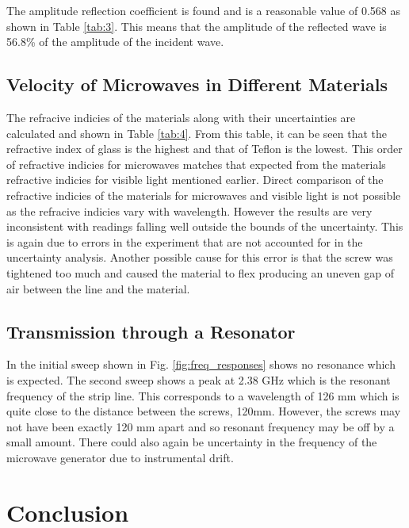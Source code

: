 \documentclass[12pt]{article}
\begin{document}
The amplitude reflection coefficient is found and is a reasonable value of 0.568 as shown in Table \ref{tab:3}.
This means that the amplitude of the reflected wave is 56.8\% of the amplitude of the incident wave.

\subsection{Velocity of Microwaves in Different Materials}
The refracive indicies of the materials along with their uncertainties are calculated and shown in Table \ref{tab:4}.
From this table, it can be seen that the refractive index of glass is the highest and that of Teflon is the lowest.
This order of refractive indicies for microwaves matches that expected from the materials refractive indicies for visible light mentioned earlier.
Direct comparison of the refractive indicies of the materials for microwaves and visible light is not possible as the refracive indicies vary with wavelength.
However the results are very inconsistent with readings falling well outside the bounds of the uncertainty. This is again
due to errors in the experiment that are not accounted for in the uncertainty analysis.
Another possible cause for this error is that the screw was tightened too much and caused the material to flex producing an 
uneven gap of air between the line and the material.

\subsection{Transmission through a Resonator}
In the initial sweep shown in Fig. \ref{fig:freq_responses} shows no resonance which is expected.
The second sweep shows a peak at 2.38 GHz which is the resonant frequency of the strip line.
This corresponds to a wavelength of 126 mm which is quite close to the distance between the screws, 120mm.
However, the screws may not have been exactly 120 mm apart and so resonant frequency may be off by a small amount.
There could also again be uncertainty in the frequency of the microwave generator due to instrumental drift.

\section{Conclusion}
\end{document}
